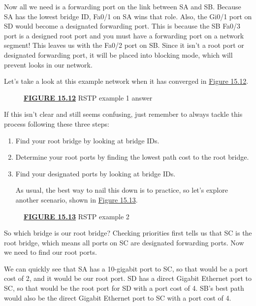 Now all we need is a forwarding port on the link between SA and SB.
Because SA has the lowest bridge ID, Fa0/1 on SA wins that role. Also,
the Gi0/1 port on SD would become a designated forwarding port. This is
because the SB Fa0/3 port is a designed root port and you must have a
forwarding port on a network segment! This leaves us with the Fa0/2 port
on SB. Since it isn't a root port or designated forwarding port, it will
be placed into blocking mode, which will prevent looks in our network.

Let's take a look at this example network when it has converged in
\protect\hyperlink{c15.xhtmlux5cux23figure15-12}{Figure 15.12}.

\begin{figure}
\centering
\caption{{\protect\hyperlink{c15.xhtmlux5cux23figureanchor15-12}{\textbf{FIGURE
15.12}} RSTP example 1 answer}}
\end{figure}

If this isn't clear and still seems confusing, just remember to always
tackle this process following these three steps:

\begin{enumerate}
\item
  Find your root bridge by looking at bridge IDs.
\item
  Determine your root ports by finding the lowest path cost to the root
  bridge.
\item
  Find your designated ports by looking at bridge IDs.

  As usual, the best way to nail this down is to practice, so let's
  explore another scenario, shown in
  \protect\hyperlink{c15.xhtmlux5cux23figure15-13}{Figure 15.13}.
\end{enumerate}



\begin{figure}
\centering
\caption{{\protect\hyperlink{c15.xhtmlux5cux23figureanchor15-13}{\textbf{FIGURE
15.13}} RSTP example 2}}
\end{figure}

So which bridge is our root bridge? Checking priorities first tells us
that SC is the root bridge, which means all ports on SC are designated
forwarding ports. Now we need to find our root ports.

We can quickly see that SA has a 10-gigabit port to SC, so that would be
a port cost of 2, and it would be our root port. SD has a direct Gigabit
Ethernet port to SC, so that would be the root port for SD with a port
cost of 4. SB's best path would also be the direct Gigabit Ethernet port
to SC with a port cost of 4.

